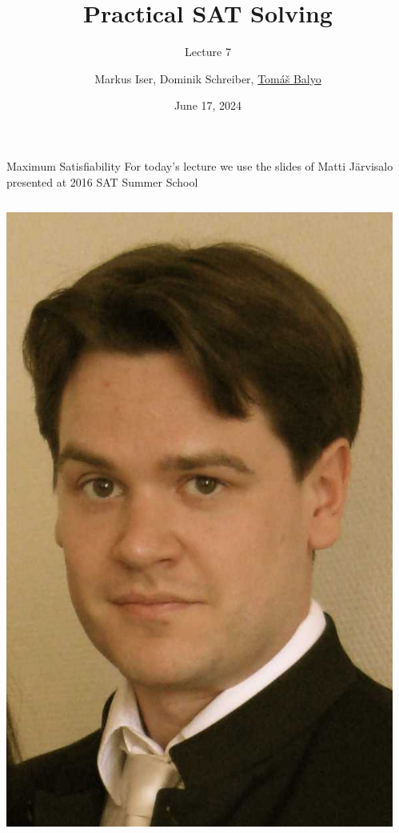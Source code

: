 \documentclass[t]{sdqbeamer}
\title[SAT Solving]{Practical SAT Solving}
\subtitle{Lecture 7}
\author{Markus Iser, Dominik Schreiber, \underline{Tom\'a\v{s} Balyo}}
\date{June 17, 2024}
\begin{document}
\begin{frame}
	\thispagestyle{empty}
	\titlepage
\end{frame}


\begin{frame}{Maximum Satisfiability}
For today's lecture we use the slides of Matti J\"{a}rvisalo presented at 2016 SAT Summer School

\begin{columns}
\begin{column}{0.3\textwidth}
\centering
\includegraphics[scale=0.15]{figures/l09/jarvisalo.jpg}
\end{column}
\begin{column}{0.3\textwidth}
\centering

\end{column}
\end{columns}
\end{frame}
\end{document}
